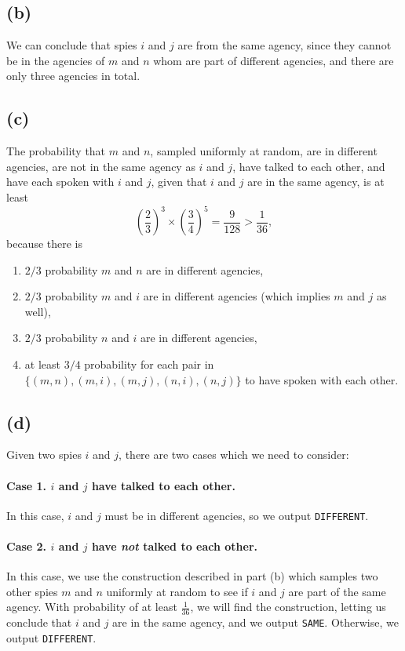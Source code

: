 \documentclass{6046}
\begin{document}
\subsection*{(b)}
We can conclude that spies $i$ and $j$ are from the
same agency, since they cannot be in the agencies
of $m$ and $n$ whom are part of different agencies,
and there are only three agencies in total.

\subsection*{(c)}
The probability that $m$ and $n$, sampled
uniformly at random, are in different
agencies, are not in the same agency as $i$ and $j$,
have talked to each other, and have
each spoken with $i$ and $j$, given that
$i$ and $j$ are in the same agency, is
at least
\[
    (\frac{2}{3})^3 \times (\frac{3}{4})^5 = \frac{9}{128} > \frac{1}{36},
\]
because there is
\vspace{-1em}
\begin{enumerate}[noitemsep]
    \item $2/3$ probability $m$ and $n$ are in different agencies,
    \item $2/3$ probability $m$ and $i$ are in different agencies
          (which implies $m$ and $j$ as well),
    \item $2/3$ probability $n$ and $i$ are in different agencies,
    \item at least $3/4$ probability for each pair in
          $\{(m, n), (m, i), (m, j), (n, i), (n, j)\}$ to have spoken with each other.
\end{enumerate}

\subsection*{(d)}
Given two spies $i$ and $j$, there are two cases
which we need to consider:
\vspace{-1em}
\paragraph{Case 1. $i$ and $j$ have talked to each other.}
In this case, $i$ and $j$ must be in different agencies,
so we output {\tt DIFFERENT}.

\vspace{-1em}
\paragraph{Case 2. $i$ and $j$ have {\it not} talked to each other.}
In this case, we use the construction described
in part (b) which samples two other
spies $m$ and $n$ uniformly at random
to see if $i$ and $j$ are part of the
same agency. With probability of at least
$\frac{1}{36}$, we will find the construction,
letting us conclude that $i$ and $j$ are in the
same agency, and we output {\tt SAME}. Otherwise, we
output {\tt DIFFERENT}.
\end{document}
